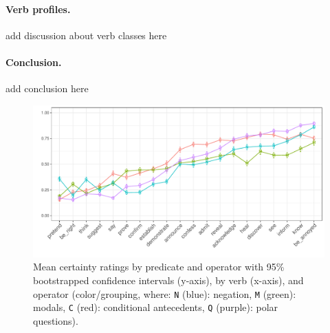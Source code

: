 \documentclass[12pt, a4paper]{scrartcl}
\begin{document}

\vspace{-\baselineskip}
\paragraph{Verb profiles.} %
	add discussion about verb classes here

\vspace{-\baselineskip}
\paragraph{Conclusion.} %
	add conclusion here

\pagebreak
\begin{figure}[t]
		\vspace{-.8\baselineskip}
		\centering
		\includegraphics[width=\textwidth]{graphs/proj-by-both.pdf}\vspace{-1.2\baselineskip}
		\caption{\small Mean certainty ratings by predicate and operator with 95\% bootstrapped confidence intervals (y-axis), by verb (x-axis), and operator (color/grouping, where: \texttt{N} (blue): negation, \texttt{M} (green): modals, \texttt{C} (red): conditional antecedents, \texttt{Q} (purple): polar questions).}
		\label{fig:figure1}
	\end{figure}


\end{document}
